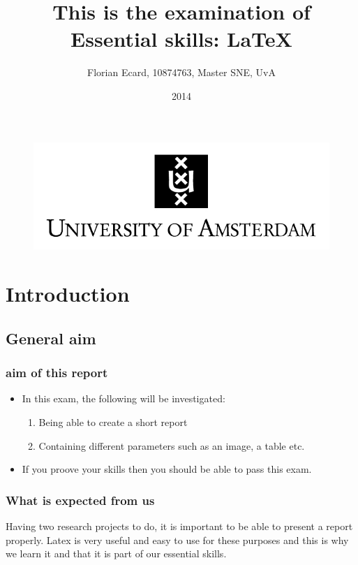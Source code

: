 \documentclass[12pt]{report}
\begin{document}
\begin{figure}[!bh]
	\begin{center}
		\title{This is the examination of Essential skills: \LaTeX}
		\author{Florian Ecard, 10874763, Master SNE, UvA} 
		\date{2014\\}
	\maketitle 
		\includegraphics{uva.jpeg}
		\label{sec:uva}
	\end{center}
\end{figure}


\newpage

	\tableofcontents

\newpage
\chapter{Introduction}
	\section{General aim}
		\subsection{aim of this report}
			\begin{itemize}
				\item In this exam, the following will be investigated:
				\begin{enumerate}
					\item Being able to create a short report
					\item Containing different parameters such as an image, a table etc. 
				\end{enumerate}
				\item If you proove your skills then you should be able to pass this exam.
			\end{itemize}
		\subsection{What is expected from us}
		Having two research projects to do, it is important to be able to present a report properly. Latex is very useful and easy to use for these purposes and this is why we learn it and that it is part of our essential skills. 
			
\end{document}
